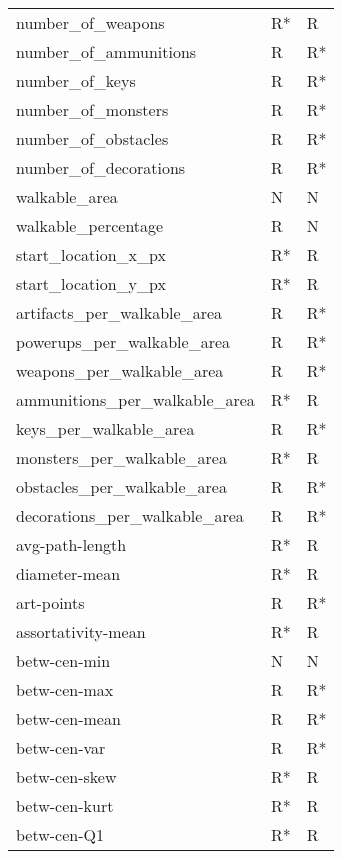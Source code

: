 \documentclass{report}
\begin{document}
\begin{longtable}{lll}
	number\_of\_weapons             &     R* &    R \\
	number\_of\_ammunitions         &      R &   R* \\
	number\_of\_keys                &      R &   R* \\
	number\_of\_monsters            &      R &   R* \\
	number\_of\_obstacles           &      R &   R* \\
	number\_of\_decorations         &      R &   R* \\
	walkable\_area                 &      N &    N \\
	walkable\_percentage           &      R &    N \\
	start\_location\_x\_px           &     R* &    R \\
	start\_location\_y\_px           &     R* &    R \\
	artifacts\_per\_walkable\_area   &      R &   R* \\
	powerups\_per\_walkable\_area    &      R &   R* \\
	weapons\_per\_walkable\_area     &      R &   R* \\
	ammunitions\_per\_walkable\_area &     R* &    R \\
	keys\_per\_walkable\_area        &      R &   R* \\
	monsters\_per\_walkable\_area    &     R* &    R \\
	obstacles\_per\_walkable\_area   &      R &   R* \\
	decorations\_per\_walkable\_area &      R &   R* \\
	avg-path-length               &     R* &    R \\
	diameter-mean                 &     R* &    R \\
	art-points                    &      R &   R* \\
	assortativity-mean            &     R* &    R \\
	betw-cen-min                  &      N &    N \\
	betw-cen-max                  &      R &   R* \\
	betw-cen-mean                 &      R &   R* \\
	betw-cen-var                  &      R &   R* \\
	betw-cen-skew                 &     R* &    R \\
	betw-cen-kurt                 &     R* &    R \\
	betw-cen-Q1                   &     R* &    R \\

\end{longtable}
\end{document}
